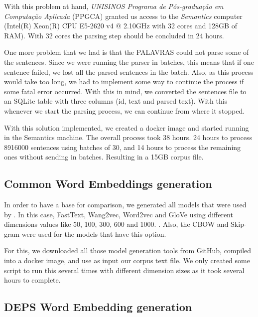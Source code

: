 With this problem at hand, \textit{UNISINOS Programa de Pós-graduação em Computação Aplicada} (PPGCA) granted us access to the \textit{Semantics} computer (Intel(R) Xeon(R) CPU E5-2620 v4 @ 2.10GHz with 32 cores and 128GB of RAM). With 32 cores the parsing step should be concluded in 24 hours.

One more problem that we had is that the PALAVRAS could not parse some of the sentences. Since we were running the parser in batches, this means that if one sentence failed, we lost all the parsed sentences in the batch. Also, as this process would take too long, we had to implement some way to continue the process if some fatal error occurred. With this in mind, we converted the sentences file to an SQLite table with three columns (id, text and parsed text). With this whenever we start the parsing process, we can continue from where it stopped.

With this solution implemented, we created a docker image and started running in the Semantics machine. The overall process took 38 hours. 24 hours to process 8916000 sentences using batches of 30, and 14 hours to process the remaining ones without sending in batches. Resulting in a 15GB corpus file.


\subsection{Common Word Embeddings generation}\label{chap:methodsandmaterials:wegeneration}

In order to have a base for comparison, we generated all models that were used by . In this case, FastText, Wang2vec, Word2vec and GloVe using different dimensions values like 50, 100, 300, 600 and 1000. \cite{bojanowski2016enriching, Ling:2015:naacl, Mikolov2013DistributedRO, Pennington2014}. Also, the CBOW and Skip-gram were used for the models that have this option.

For this, we downloaded all those model generation tools from GitHub, compiled into a docker image, and use as input our corpus text file. We only created some script to run this several times with different dimension sizes as it took several hours to complete.


\subsection{DEPS Word Embedding generation}\label{chap:methodsandmaterials:depsgeneration}

